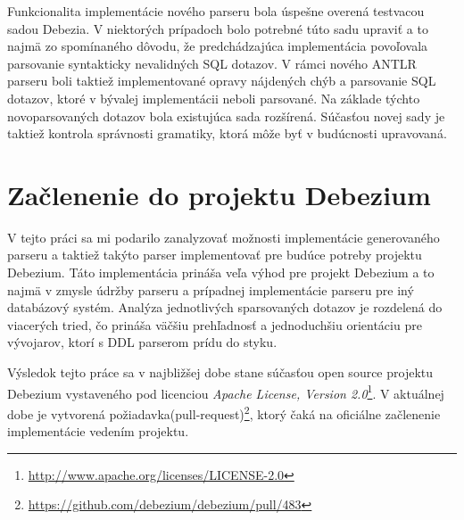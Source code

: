 Funkcionalita implementácie nového parseru bola úspešne overená testvacou sadou Debezia. V niektorých prípadoch bolo potrebné túto sadu upraviť a to najmä zo spomínaného dôvodu, že predchádzajúca implementácia povoľovala parsovanie syntakticky nevalidných SQL dotazov. V rámci nového ANTLR parseru boli taktiež implementované opravy nájdených chýb a parsovanie SQL dotazov, ktoré v bývalej implementácii neboli parsované. Na základe týchto novoparsovaných dotazov bola existujúca sada rozšírená. Súčasťou novej sady je taktiež kontrola správnosti gramatiky, ktorá môže byť v budúcnosti upravovaná.

\section{Začlenenie do projektu Debezium}
V tejto práci sa mi podarilo zanalyzovať možnosti implementácie generovaného parseru a taktiež takýto parser implementovať pre budúce potreby projektu Debezium. Táto implementácia prináša veľa výhod pre projekt Debezium a to najmä v zmysle údržby parseru a prípadnej implementácie parseru pre iný databázový systém. Analýza jednotlivých sparsovaných dotazov je rozdelená do viacerých tried, čo prináša väčšiu prehľadnosť a jednoduchšiu orientáciu pre vývojarov, ktorí s DDL parserom prídu do styku.

Výsledok tejto práce sa v najbližšej dobe stane súčasťou open source projektu Debezium vystaveného pod licenciou \textit{Apache License, Version 2.0}\footnote{\url{http://www.apache.org/licenses/LICENSE-2.0}}.
V aktuálnej dobe je vytvorená požiadavka(pull-request)\footnote{\url{https://github.com/debezium/debezium/pull/483}}, ktorý čaká na oficiálne začlenenie implementácie vedením projektu. 

